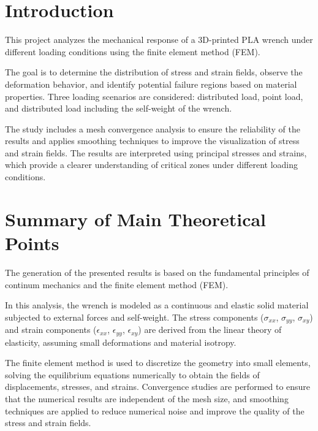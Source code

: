 \documentclass[12pt]{article}
\begin{document}
\thispagestyle{empty}
\newpage
{}
\setcounter{page}{1}

\section{Introduction}

This project analyzes the mechanical response of a 3D-printed PLA wrench under different loading conditions using the finite element method (FEM).

The goal is to determine the distribution of stress and strain fields, observe the deformation behavior, and identify potential failure regions based on material properties.  
Three loading scenarios are considered: distributed load, point load, and distributed load including the self-weight of the wrench.

The study includes a mesh convergence analysis to ensure the reliability of the results and applies smoothing techniques to improve the visualization of stress and strain fields.  
The results are interpreted using principal stresses and strains, which provide a clearer understanding of critical zones under different loading conditions.

\newpage

\section{Summary of Main Theoretical Points}

The generation of the presented results is based on the fundamental principles of continum mechanics and the finite element method (FEM).

In this analysis, the wrench is modeled as a continuous and elastic solid material subjected to external forces and self-weight.  
The stress components ($\sigma_{xx}$, $\sigma_{yy}$, $\sigma_{xy}$) and strain components ($\epsilon_{xx}$, $\epsilon_{yy}$, $\epsilon_{xy}$) are derived from the linear theory of elasticity, assuming small deformations and material isotropy.

The finite element method is used to discretize the geometry into small elements, solving the equilibrium equations numerically to obtain the fields of displacements, stresses, and strains.  
Convergence studies are performed to ensure that the numerical results are independent of the mesh size, and smoothing techniques are applied to reduce numerical noise and improve the quality of the stress and strain fields.
\end{document}
